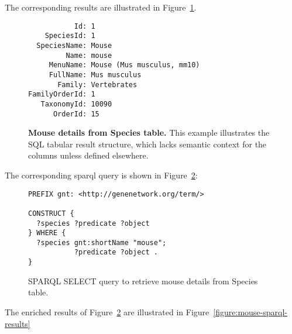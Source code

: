 The corresponding results are illustrated in Figure~\ref{sql:mouse-results}.

\begin{figure}[H]
\centering
\begin{verbatim}
           Id: 1
    SpeciesId: 1
  SpeciesName: Mouse
         Name: mouse
     MenuName: Mouse (Mus musculus, mm10)
     FullName: Mus musculus
       Family: Vertebrates
FamilyOrderId: 1
   TaxonomyId: 10090
      OrderId: 15
\end{verbatim}
\caption[SQL Results: Fetching mouse details from Species table]{\textbf{Mouse details from Species table.}  This example illustrates the SQL tabular result structure, which lacks semantic context for the columns unless defined elsewhere.}\label{sql:mouse-results}
\end{figure}

The corresponding sparql query is shown in Figure~\ref{sparql:mouse}:

\begin{figure}[H]
\centering
\begin{verbatim}
PREFIX gnt: <http://genenetwork.org/term/>

CONSTRUCT {
  ?species ?predicate ?object
} WHERE {
  ?species gnt:shortName "mouse";
           ?predicate ?object .
}
\end{verbatim}
\caption[SPARQL: Fetching mouse details]{SPARQL SELECT query to retrieve mouse details from Species table.}\label{sparql:mouse}
\end{figure}

The enriched results of Figure~\ref{sparql:mouse} are illustrated in Figure~\ref{figure:mouse-sparql-results}

